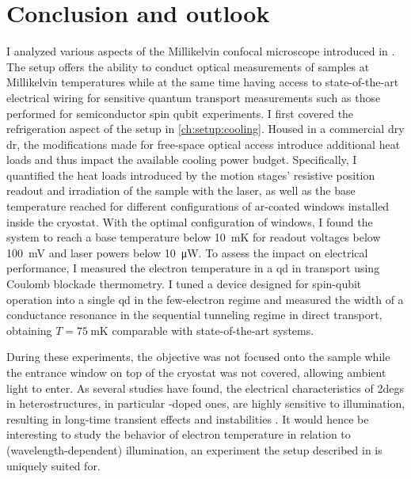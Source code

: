 \chapter{Conclusion and outlook}\label{ch:setup:conclusion}
 \thispart I analyzed various aspects of the Millikelvin confocal microscope introduced in .
The setup offers the ability to conduct optical measurements of samples at Millikelvin temperatures while at the same time having access to state-of-the-art electrical wiring for sensitive quantum transport measurements such as those performed for semiconductor spin qubit experiments.
I first covered the refrigeration aspect of the setup in \cref{ch:setup:cooling}.
Housed in a commercial dry \gls{dr}, the modifications made for free-space optical access introduce additional heat loads and thus impact the available cooling power budget.
Specifically, I quantified the heat loads introduced by the motion stages' resistive position readout and irradiation of the sample with the laser, as well as the base temperature reached for different configurations of \gls{ar}-coated windows installed inside the cryostat.
With the optimal configuration of windows, I found the system to reach a base temperature below \qty{10}{\milli\kelvin} for readout voltages below \qty{100}{\milli\volt} and laser powers below \qty{10}{\micro\watt}.
To assess the impact on electrical performance, I measured the electron temperature in a \GaAsAlGaAs \acrlong{qd} in transport using Coulomb blockade thermometry.
I tuned a device designed for spin-qubit operation into a single \acrlong{qd} in the few-electron regime and measured the width of a conductance resonance in the sequential tunneling regime in direct transport, obtaining $T = \qty{75}{\milli\kelvin}$ comparable with state-of-the-art systems.

During these experiments, the objective was not focused onto the sample while the entrance window on top of the cryostat was not covered, allowing ambient light to enter.
As several studies have found, the electrical characteristics of \glspl{2deg} in \GaAsAlGaAs heterostructures, in particular -doped ones, are highly sensitive to illumination, resulting in long-time transient effects and instabilities \cite{Fujita2021,Shetty2022,Wang2023,Reznikov2024}.
It would hence be interesting to study the behavior of electron temperature in relation to (wavelength-dependent) illumination, an experiment the setup described in \thispart is uniquely suited for.

